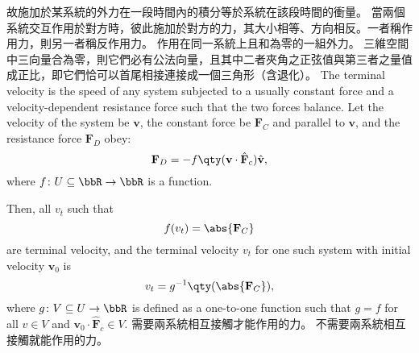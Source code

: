 \documentclass[a4paper,12pt]{article}
\begin{document}
故施加於某系統的外力在一段時間內的積分等於系統在該段時間的衝量。
當兩個系統交互作用於對方時，彼此施加於對方的力，其大小相等、方向相反。一者稱作用力，則另一者稱反作用力。
作用在同一系統上且和為零的一組外力。
三維空間中三向量合為零，則它們必有公法向量，且其中二者夾角之正弦值與第三者之量值成正比，即它們恰可以首尾相接連接成一個三角形（含退化）。
The terminal velocity is the speed of any system subjected to a usually constant force and a velocity-dependent resistance force such that the two forces balance. Let the velocity of the system be $\mathbf{v}$, the constant force be $\mathbf{F}_C$ and parallel to $\mathbf{v}$, and the resistance force $\mathbf{F}_D$ obey:
\[\mathbf{F}_D=-f\qty(\mathbf{v}\cdot\hat{\mathbf{F}}_c)\hat{\mathbf{v}},\]
where $f\colon U\subseteq\bbR\to\bbR$ is a function.

Then, all $v_t$ such that
\[f(v_t)=\abs{\mathbf{F}_C}\]
are terminal velocity, and the terminal velocity $v_t$ for one such system with initial velocity $\mathbf{v}_0$ is
\[v_t=g^{-1}\qty(\abs{\mathbf{F}_C}),\]
where $g\colon V\subseteq U\to\bbR$ is defined as a one-to-one function such that $g=f$ for all $v\in V$ and $\mathbf{v}_0\cdot\hat{\mathbf{F}}_c\in V$.
需要兩系統相互接觸才能作用的力。
不需要兩系統相互接觸就能作用的力。
\end{document}
